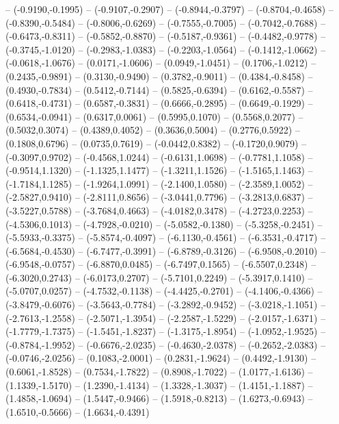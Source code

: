 {	-- (-0.9190,-0.1995)
	-- (-0.9107,-0.2907)
	-- (-0.8944,-0.3797)
	-- (-0.8704,-0.4658)
	-- (-0.8390,-0.5484)
	-- (-0.8006,-0.6269)
	-- (-0.7555,-0.7005)
	-- (-0.7042,-0.7688)
	-- (-0.6473,-0.8311)
	-- (-0.5852,-0.8870)
	-- (-0.5187,-0.9361)
	-- (-0.4482,-0.9778)
	-- (-0.3745,-1.0120)
	-- (-0.2983,-1.0383)
	-- (-0.2203,-1.0564)
	-- (-0.1412,-1.0662)
	-- (-0.0618,-1.0676)
	-- (0.0171,-1.0606)
	-- (0.0949,-1.0451)
	-- (0.1706,-1.0212)
	-- (0.2435,-0.9891)
	-- (0.3130,-0.9490)
	-- (0.3782,-0.9011)
	-- (0.4384,-0.8458)
	-- (0.4930,-0.7834)
	-- (0.5412,-0.7144)
	-- (0.5825,-0.6394)
	-- (0.6162,-0.5587)
	-- (0.6418,-0.4731)
	-- (0.6587,-0.3831)
	-- (0.6666,-0.2895)
	-- (0.6649,-0.1929)
	-- (0.6534,-0.0941)
	-- (0.6317,0.0061)
	-- (0.5995,0.1070)
	-- (0.5568,0.2077)
	-- (0.5032,0.3074)
	-- (0.4389,0.4052)
	-- (0.3636,0.5004)
	-- (0.2776,0.5922)
	-- (0.1808,0.6796)
	-- (0.0735,0.7619)
	-- (-0.0442,0.8382)
	-- (-0.1720,0.9079)
	-- (-0.3097,0.9702)
	-- (-0.4568,1.0244)
	-- (-0.6131,1.0698)
	-- (-0.7781,1.1058)
	-- (-0.9514,1.1320)
	-- (-1.1325,1.1477)
	-- (-1.3211,1.1526)
	-- (-1.5165,1.1463)
	-- (-1.7184,1.1285)
	-- (-1.9264,1.0991)
	-- (-2.1400,1.0580)
	-- (-2.3589,1.0052)
	-- (-2.5827,0.9410)
	-- (-2.8111,0.8656)
	-- (-3.0441,0.7796)
	-- (-3.2813,0.6837)
	-- (-3.5227,0.5788)
	-- (-3.7684,0.4663)
	-- (-4.0182,0.3478)
	-- (-4.2723,0.2253)
	-- (-4.5306,0.1013)
	-- (-4.7928,-0.0210)
	-- (-5.0582,-0.1380)
	-- (-5.3258,-0.2451)
	-- (-5.5933,-0.3375)
	-- (-5.8574,-0.4097)
	-- (-6.1130,-0.4561)
	-- (-6.3531,-0.4717)
	-- (-6.5684,-0.4530)
	-- (-6.7477,-0.3991)
	-- (-6.8789,-0.3126)
	-- (-6.9508,-0.2010)
	-- (-6.9548,-0.0757)
	-- (-6.8870,0.0485)
	-- (-6.7497,0.1565)
	-- (-6.5507,0.2348)
	-- (-6.3020,0.2743)
	-- (-6.0173,0.2707)
	-- (-5.7101,0.2249)
	-- (-5.3917,0.1410)
	-- (-5.0707,0.0257)
	-- (-4.7532,-0.1138)
	-- (-4.4425,-0.2701)
	-- (-4.1406,-0.4366)
	-- (-3.8479,-0.6076)
	-- (-3.5643,-0.7784)
	-- (-3.2892,-0.9452)
	-- (-3.0218,-1.1051)
	-- (-2.7613,-1.2558)
	-- (-2.5071,-1.3954)
	-- (-2.2587,-1.5229)
	-- (-2.0157,-1.6371)
	-- (-1.7779,-1.7375)
	-- (-1.5451,-1.8237)
	-- (-1.3175,-1.8954)
	-- (-1.0952,-1.9525)
	-- (-0.8784,-1.9952)
	-- (-0.6676,-2.0235)
	-- (-0.4630,-2.0378)
	-- (-0.2652,-2.0383)
	-- (-0.0746,-2.0256)
	-- (0.1083,-2.0001)
	-- (0.2831,-1.9624)
	-- (0.4492,-1.9130)
	-- (0.6061,-1.8528)
	-- (0.7534,-1.7822)
	-- (0.8908,-1.7022)
	-- (1.0177,-1.6136)
	-- (1.1339,-1.5170)
	-- (1.2390,-1.4134)
	-- (1.3328,-1.3037)
	-- (1.4151,-1.1887)
	-- (1.4858,-1.0694)
	-- (1.5447,-0.9466)
	-- (1.5918,-0.8213)
	-- (1.6273,-0.6943)
	-- (1.6510,-0.5666)
	-- (1.6634,-0.4391)
}
